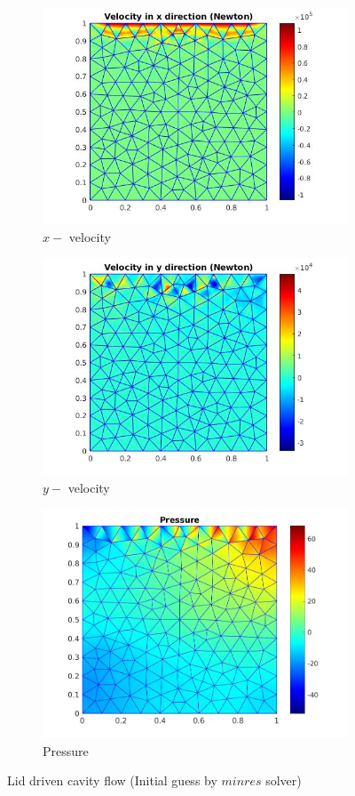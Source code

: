\documentclass[a4paper,openany]{book}
\begin{document}
\begin{figure}
  \begin{subfigure}{\textwidth}
    \includegraphics[width=0.8\linewidth]{lid_newton_vx_minres.jpg}
    \caption{$x-$ velocity}
  \label{x_vel_navier_stoke_minres_lid}
  \end{subfigure}
  \begin{subfigure}{\textwidth}
    \includegraphics[width=0.8\linewidth]{lid_newton_vy_minres.jpg}
    \caption{$y-$ velocity}
  \label{y_vel_navier_stoke_minres_lid}
  \end{subfigure}
  \begin{subfigure}{\textwidth}
    \includegraphics[width=0.8\linewidth]{lid_newton_pressure_minres.jpg}
    \caption{Pressure}
  \label{pressure_navier_stoke_minres_lid}
  \end{subfigure}
\caption{Lid driven cavity flow (Initial guess by $minres$ solver)}
\label{lid_driven_cavity_n_s_minres}
\end{figure}
\end{document}
